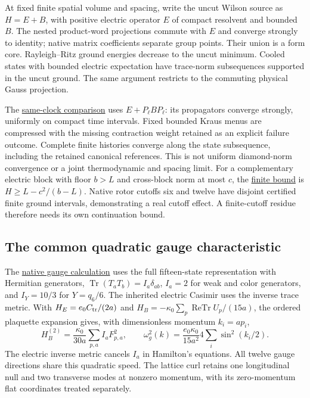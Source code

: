 At fixed finite spatial volume and spacing, write the uncut Wilson source
as $H=E+B$, with positive electric operator $E$ of compact resolvent and
bounded $B$. The nested product-word projections commute with $E$ and
converge strongly to identity; native matrix coefficients separate group
points. Their union is a form core. Rayleigh--Ritz ground energies decrease
to the uncut minimum. Cooled states with bounded electric expectation
have trace-norm subsequences supported in the uncut ground. The same
argument restricts to the commuting physical Gauss projection.

The \href{https://github.com/FloatingPragma/observer-patch-holography/blob/main/model/particle_link_cutoff_limit/PROOF.md}{same-clock comparison}
uses $E+P_\ell BP_\ell$: its propagators converge strongly, uniformly on
compact time intervals. Fixed bounded Kraus menus are compressed with
the missing contraction weight retained as an explicit failure outcome.
Complete finite histories converge along the state subsequence, including
the retained canonical references. This is not uniform diamond-norm
convergence or a joint thermodynamic and spacing limit. For a complementary
electric block with floor $b>L$ and cross-block norm at most $c$, the
\href{https://github.com/FloatingPragma/observer-patch-holography/blob/main/Lean/QFT/ElectricCutoffFloor.lean}{finite bound}
is $H\ge L-c^2/(b-L)$. Native rotor cutoffs six and twelve have disjoint
certified finite ground intervals, demonstrating a real cutoff effect.
A finite-cutoff residue therefore needs its own continuation bound.

\subsection{The common quadratic gauge characteristic}

The \href{https://github.com/FloatingPragma/observer-patch-holography/blob/main/model/particle_gauge_characteristics/PROOF.md}{native gauge calculation}
uses the full fifteen-state representation with Hermitian generators,
$\operatorname{Tr}(T_aT_b)=I_a\delta_{ab}$,
$I_a=2$ for weak and color generators, and $I_Y=10/3$ for $Y=q_6/6$.
The inherited electric Casimir uses the inverse trace metric. With
$H_E=e_0C_{\rm tr}/(2a)$ and
$H_B=-\kappa_0\sum_p\operatorname{ReTr}U_p/(15a)$, the ordered
plaquette expansion gives, with dimensionless momentum $k_i=a p_i$,
\[
 H_B^{(2)}=\frac{\kappa_0}{30a}\sum_{p,a}I_a F_{p,a}^2,
 \qquad \omega_g^2(k)=\frac{e_0\kappa_0}{15a^2}
                         4\sum_i\sin^2(k_i/2).
\]
The electric inverse metric cancels $I_a$ in Hamilton's equations.
All twelve gauge directions share this quadratic speed. The lattice
curl retains one longitudinal null and two transverse modes at nonzero
momentum, with its zero-momentum flat coordinates treated separately.

